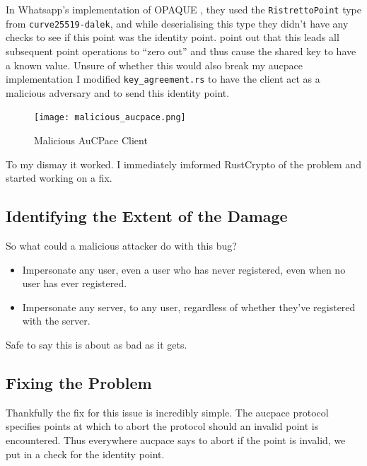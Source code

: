 In Whatsapp's implementation of OPAQUE \cite{opaque}, they used the \texttt{RistrettoPoint} type from \texttt{curve25519-dalek}, and while deserialising this type they didn't have any checks to see if this point was the identity point.
 point out that this leads all subsequent point operations to \enquote{zero out} and thus cause the shared key to have a known value.
Unsure of whether this would also break my \gls{aucpace} implementation I modified \texttt{key\_agreement.rs} to have the client act as a malicious adversary and to send this identity point.


\begin{figure}[H]
  \centering

  \texttt{[image: malicious\_aucpace.png]}
  \caption{Malicious AuCPace Client}
  \label{fig:break-everything}
\end{figure}

To my dismay it worked.
I immediately imformed RustCrypto of the problem and started working on a fix.

\subsection{Identifying the Extent of the Damage}
So what could a malicious attacker do with this bug?

\begin{itemize}
  \item{Impersonate any user, even a user who has never registered, even when no user has ever registered.}
  \item{Impersonate any server, to any user, regardless of whether they've registered with the server.}
\end{itemize}

Safe to say this is about as bad as it gets.

\subsection{Fixing the Problem}
Thankfully the fix for this issue is incredibly simple.
The \gls{aucpace} protocol specifies points at which to abort the protocol should an invalid point is encountered.
Thus everywhere \gls{aucpace} says to abort if the point is invalid, we put in a check for the identity point.


